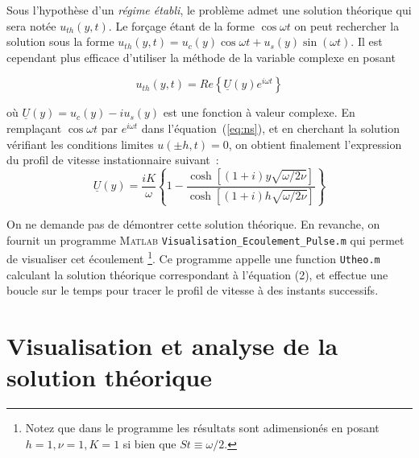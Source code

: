 \documentclass[a4,12pt]{article}
\begin{document}
\noindent
Sous l'hypothèse d'un {\em régime établi}, le problème admet une solution théorique qui sera notée $u_{th}(y,t)$. 
Le forçage étant de la forme $\cos \omega t $ on peut rechercher la solution sous la forme $u_{th}(y,t) = u_c(y) \cos \omega t + u_s(y) \sin(\omega t)$. 
Il est cependant plus efficace d'utiliser la méthode de la variable complexe en posant 

$$u_{th}(y, t) = Re \left \{ \underline{U}(y) e^{i \omega t} \right \}$$ 

où $\underline{U}(y) = u_c(y) - i u_s(y)$ est une fonction à valeur complexe. En remplaçant $\cos \omega t$ par $e^{i\omega t}$  dans l'\'equation~(\ref{eq:ns}), et en cherchant la solution vérifiant les conditions limites $u(\pm h,t) = 0$, on obtient finalement l'expression du profil de vitesse instationnaire suivant~:
\begin{equation}
\label{sol}
 \underline{U}(y) = \frac{iK}{\omega} \left \{ 
1 - \frac{\cosh [ ( 1+i) y \sqrt{\omega/2\nu} ]}{\cosh [ ( 1+i) h \sqrt{\omega / 2 \nu}  ]}
\right \}
\end{equation}

On ne demande pas de démontrer cette solution théorique. En revanche, on fournit un programme \textsc{Matlab} \texttt{Visualisation\_Ecoulement\_Pulse.m} 
qui permet de visualiser cet écoulement
\footnote{ Notez que dans le programme les résultats sont adimensionés en posant $h=1,\nu = 1,K=1$ si bien que $St \equiv \omega/2$.}.
 Ce programme appelle une function  \texttt{Utheo.m} calculant la solution théorique correspondant à l'équation (2), 
et effectue une boucle sur le temps pour tracer le profil de vitesse à des instants successifs.




\section{Visualisation et analyse de la solution théorique}
\end{document}
